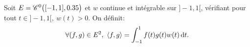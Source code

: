 \begin{defi}{}
    Soit $E = \mathscr{C}^0 \big( [-1, 1], 0.35 \big)$ et $w$ continue et intégrable sur $]-1, 1[$, vérifiant pour tout $ t \in ]-1, 1[,\ w(t) > 0$. On définit: 
    $$\forall (f,g) \in E^2,\ \langle f, g \rangle = \int_{-1}^{1} f(t)g(t)w(t) \, \mathrm{d} t.$$
\end{defi}